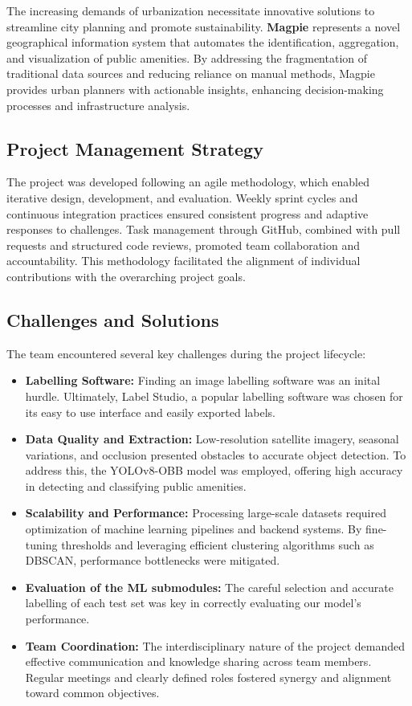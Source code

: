 The increasing demands of urbanization necessitate innovative solutions to
streamline city planning and promote sustainability. \textbf{Magpie} represents
a novel geographical information system that automates the identification,
aggregation, and visualization of public amenities. By addressing the
fragmentation of traditional data sources and reducing reliance on manual
methods, Magpie provides urban planners with actionable insights, enhancing
decision-making processes and infrastructure analysis.

\subsection{Project Management Strategy}
The project was developed following an agile methodology, which enabled
iterative design, development, and evaluation. Weekly sprint cycles and
continuous integration practices ensured consistent progress and adaptive
responses to challenges. Task management through GitHub, combined with pull
requests and structured code reviews, promoted team collaboration and
accountability. This methodology facilitated the alignment of individual
contributions with the overarching project goals.

\subsection{Challenges and Solutions}
The team encountered several key challenges during the project lifecycle:
\begin{itemize}
    \item \textbf{Labelling Software:} Finding an image labelling software was 
    an inital hurdle. Ultimately, Label Studio, a popular labelling software
     was chosen for its easy to use interface and easily exported labels. 
    \item \textbf{Data Quality and Extraction:} Low-resolution satellite
    imagery, seasonal variations, and occlusion presented obstacles to accurate
    object detection. To address this, the YOLOv8-OBB model was employed,
    offering high accuracy in detecting and classifying public amenities.
    \item \textbf{Scalability and Performance:} Processing large-scale datasets
    required optimization of machine learning pipelines and backend systems. By
    fine-tuning thresholds and leveraging efficient clustering algorithms such
    as DBSCAN, performance bottlenecks were mitigated.
    \item \textbf{Evaluation of the ML submodules:} The careful selection and accurate 
    labelling of each test set was key in correctly evaluating our model's performance. 
    \item \textbf{Team Coordination:} The interdisciplinary nature of the
    project demanded effective communication and knowledge sharing across team
    members. Regular meetings and clearly defined roles fostered synergy and
    alignment toward common objectives.
\end{itemize}

